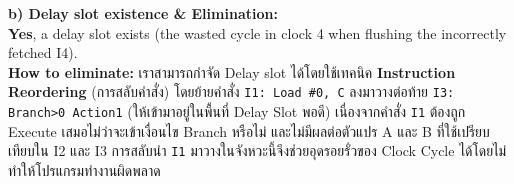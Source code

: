 \documentclass[12pt]{article}
\begin{document}
\textbf{b) Delay slot existence \& Elimination:} \\
\textbf{Yes}, a delay slot exists (the wasted cycle in clock 4 when flushing the incorrectly fetched I4). \\
\textbf{How to eliminate:} เราสามารถกำจัด Delay slot ได้โดยใช้เทคนิค \textbf{Instruction Reordering} (การสลับคำสั่ง) โดยย้ายคำสั่ง \texttt{I1: Load \#0, C} ลงมาวางต่อท้าย \texttt{I3: Branch>0 Action1} (ให้เข้ามาอยู่ในพื้นที่ Delay Slot พอดี) 
เนื่องจากคำสั่ง \texttt{I1} ต้องถูก Execute เสมอไม่ว่าจะเข้าเงื่อนไข Branch หรือไม่ และไม่มีผลต่อตัวแปร A และ B ที่ใช้เปรียบเทียบใน I2 และ I3 การสลับนำ \texttt{I1} มาวางในจังหวะนี้จึงช่วยอุดรอยรั่วของ Clock Cycle ได้โดยไม่ทำให้โปรแกรมทำงานผิดพลาด
\end{document}
